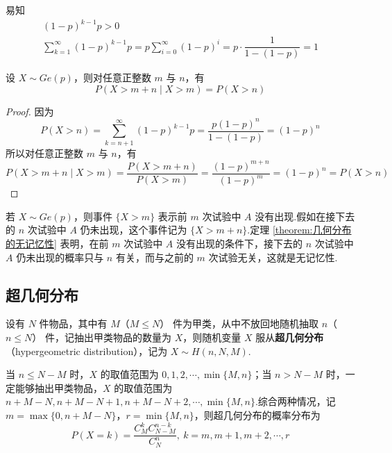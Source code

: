易知
\begin{gather*}
    (1-p)^{k-1} p > 0\\
    \sum_{k=1}^\infty (1-p)^{k-1} p = p \sum_{i=0}^\infty (1-p)^i = p \cdot \dfrac{1}{1-(1-p)} = 1    
\end{gather*}

\begin{theorem}
    \indent 设 $X \sim Ge(p)$，则对任意正整数 $m$ 与 $n$，有
    \begin{equation}
        P(X > m+n \mid X>m) = P(X>n)
    \end{equation}
\end{theorem}

\begin{proof}
    因为
    $$
    P(X>n) = \sum_{k=n+1}^{\infty} (1-p)^{k-1} p = \dfrac{p (1-p)^n}{1-(1-p)} = (1-p)^n
    $$
    所以对任意正整数 $m$ 与 $n$，有
    $$
    P(X > m+n \mid X>m) = \dfrac{P(X > m+n)}{P(X>m)} = \dfrac{(1-p)^{m+n}}{(1-p)^m} = (1-p)^n = P(X>n)
    $$

    \vspace{-2em}
\end{proof}

\begin{note}
    \indent 若 $X \sim Ge(p)$，则事件 $\{ X>m \}$ 表示前 $m$ 次试验中 $A$ 没有出现.假如在接下去的 $n$ 次试验中 $A$ 仍未出现，这个事件记为 $\{ X > m+n \}$.定理 \ref{theorem:几何分布的无记忆性} 表明，在前 $m$ 次试验中 $A$ 没有出现的条件下，接下去的 $n$ 次试验中 $A$ 仍未出现的概率只与 $n$ 有关，而与之前的 $m$ 次试验无关，这就是无记忆性.
\end{note}

\subsection{超几何分布}

设有 $N$ 件物品，其中有 $M$（$M \leqslant N$） 件为甲类，从中不放回地随机抽取 $n$（$n \leqslant N$） 件，记抽出甲类物品的数量为 $X$，则随机变量 $X$ 服从\textbf{超几何分布}（hypergeometric distribution），记为 $X \sim H(n,N,M)$.

当 $n \leqslant N-M$ 时，$X$ 的取值范围为 $0,1,2,\cdots,\min\{ M,n \}$；当 $n > N-M$ 时，一定能够抽出甲类物品，$X$ 的取值范围为 $n+M-N, n+M-N+1, n+M-N+2, \cdots, \min\{ M,n \}$.综合两种情况，记 $m = \max\{ 0, n+M-N \}$，$r = \min\{ M,n \}$，则超几何分布的概率分布为
$$
P(X=k) = \dfrac{C_M^k C_{N-M}^{n-k}}{C_N^n},\ k=m, m+1, m+2, \cdots, r
$$

